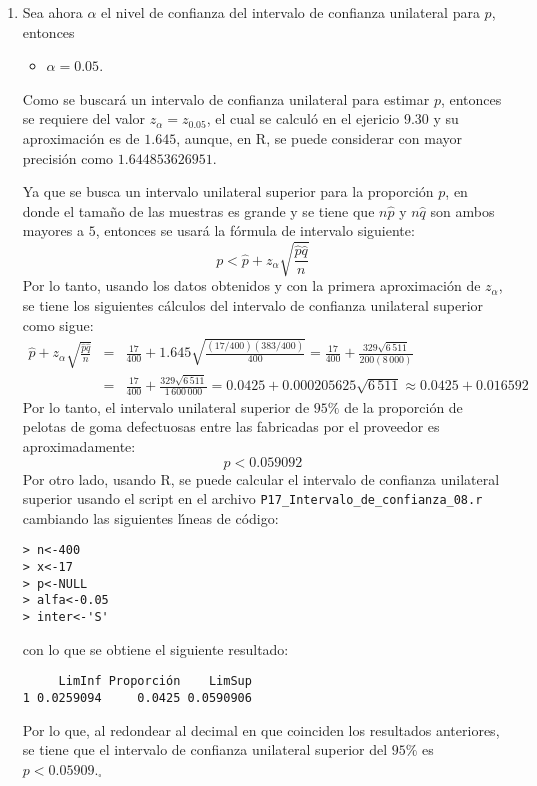 \begin{solucion}
\begin{enumerate}
  \item Sea ahora $\alpha$ el nivel de confianza del intervalo de confianza unilateral para $p$, entonces
  \begin{itemize}
   \item $\alpha = 0.05$.
  \end{itemize}
  Como se buscar\'a un intervalo de confianza unilateral para estimar $p$, entonces se requiere del valor $z_{\alpha} = z_{0.05}$, el cual se calcul\'o en el ejericio 9.30 y su aproximaci\'on es de $1.645$, aunque, en R, se puede considerar con mayor precisi\'on como $1.644853626951$.
  \par Ya que se busca un intervalo unilateral superior para la proporci\'on $p$, en donde el tama\~no de las muestras es grande y se tiene que $n\hat{p}$ y $n\hat{q}$ son ambos mayores a $5$, entonces se usar\'a la f\'ormula de intervalo siguiente:
  \begin{equation*}
   p < \hat{p} + z_{\alpha}\sqrt{\frac{\hat{p}\hat{q}}{n}}
  \end{equation*}
  Por lo tanto, usando los datos obtenidos y con la primera aproximaci\'on de $z_{\alpha}$, se tiene los siguientes c\'alculos del intervalo de confianza unilateral superior como sigue:
  \begin{eqnarray*}
   \hat{p} + z_{\alpha}\sqrt{\frac{\hat{p}\hat{q}}{n}} & = & \frac{17}{400} + 1.645\sqrt{\frac{(17/400)(383/400)}{400}} = \frac{17}{400} + \frac{329\sqrt{6\,511}}{200(8\,000)} \\ 
   & = & \frac{17}{400} + \frac{329\sqrt{6\,511}}{1\,600\,000} = 0.0425 + 0.000205625\sqrt{6\,511} \approx 0.0425 + 0.016592
  \end{eqnarray*}
  Por lo tanto, el intervalo unilateral superior de $95\%$ de la proporci\'on de pelotas de goma defectuosas entre las fabricadas por el proveedor es aproximadamente:
  \begin{equation*}
   p < 0.059092
  \end{equation*}
  Por otro lado, usando R, se puede calcular el intervalo de confianza unilateral superior usando el script en el archivo \texttt{P17\_Intervalo\_de\_confianza\_08.r} cambiando las siguientes l\'{\i}neas de c\'odigo:
  \begin{verbatim}
> n<-400
> x<-17
> p<-NULL
> alfa<-0.05
> inter<-'S'
  \end{verbatim}
  \vspace{-0.5cm}
  con lo que se obtiene el siguiente resultado:
  \begin{verbatim}
     LimInf Proporción    LimSup
1 0.0259094     0.0425 0.0590906
  \end{verbatim}
  \vspace{-0.5cm}
  Por lo que, al redondear al decimal en que coinciden los resultados anteriores, se tiene que el intervalo de confianza unilateral superior del $95\%$ es $ p < 0.05909$.${}_{\square}$
  

\end{enumerate}
\end{solucion}
